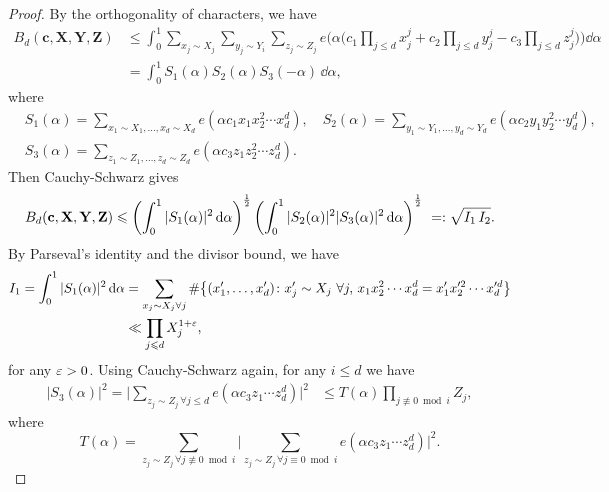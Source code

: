 \begin{proof}
  By the orthogonality of characters, we have
  \begin{align*}
  B_d(\mathbf{c},\mathbf{X},\mathbf{Y},\mathbf{Z}) &\leq \int_0^1 \sum_{x_j\sim X_j}\sum_{y_j\sim Y_i}\sum_{z_j\sim Z_j}e\Big(\alpha\Big(c_1\prod_{j\leq d}x_j^j+c_2\prod_{j\leq d}y_j^j-c_3\prod_{j\leq d}z_j^j\Big)\Big)\dd{\alpha} \nonumber\\
  &= \int_{0}^1 S_1(\alpha)S_2(\alpha)S_3(-\alpha)\, \dd \alpha,
  \end{align*}
  where
  \begin{align*}
  &S_1(\alpha)=\sum_{x_1\sim X_1,\ldots, x_d\sim X_d}e(\alpha c_1x_1x_2^2\cdots x_d^d),\quad S_2(\alpha)=\sum_{y_1\sim Y_1,\ldots, y_d\sim Y_d}e(\alpha c_2y_1y_2^2\cdots y_d^d),\\
  &S_3(\alpha)=\sum_{z_1\sim Z_1,\ldots, z_d\sim Z_d}e(\alpha c_3z_1z_2^2\cdots z_d^d).
  \end{align*}
  Then Cauchy-Schwarz gives
  \begin{align}\label{eq:Bc123}
  B_d(\mathbf{c},\mathbf{X},\mathbf{Y},\mathbf{Z}) \leqslant \left(\int_{0}^1|S_1(\alpha)|^2\, \textnormal{d}\alpha\right)^{\frac{1}{2}}\left(\int_{0}^1|S_2(\alpha)|^2|S_3(\alpha)|^2\, \textnormal{d}\alpha\right)^{\frac{1}{2}} \ =: \sqrt{I_1\,I_2}.
  \end{align}
  By Parseval's identity and the divisor bound, we have
  \begin{align}\label{eq:prop3.1I1}\begin{split}
  I_1 =\int_{0}^1|S_1(\alpha)|^2\, \textnormal{d}\alpha
  &= \sum_{x_j\sim X_j\forall j}\#\big\{(x_1',\ldots, x_d')\colon x_j'\sim X_j\,\, \forall j,\, x_1x_2^2\cdots x_d^d=x_1'x_2'^2\cdots x_d'^d \big\}\\
  & \ll \prod_{j\leqslant d} X_j^{1+\varepsilon},
  \end{split}
  \end{align}
  for any $\varepsilon>0$.
  Using Cauchy-Schwarz again, for any $i\le d$ we have
  \begin{align*}
  |S_3(\alpha)|^2 = \bigg|\sum_{z_j\sim Z_j\,\forall j\leq d}e(\alpha c_3z_1\cdots z_d^d)\bigg|^2
  &\leq T(\alpha)\prod_{j\not \equiv 0\bmod i}Z_{j},
  \end{align*}
  where
  \[
  T(\alpha)=
  \sum_{z_j\sim Z_j\, \forall j\not \equiv 0\bmod i}\bigg|\sum_{z_j\sim Z_j\, \forall j\equiv 0\bmod i}e(\alpha c_3z_1\cdots z_d^d)\bigg|^2.
  \]


\end{proof}
